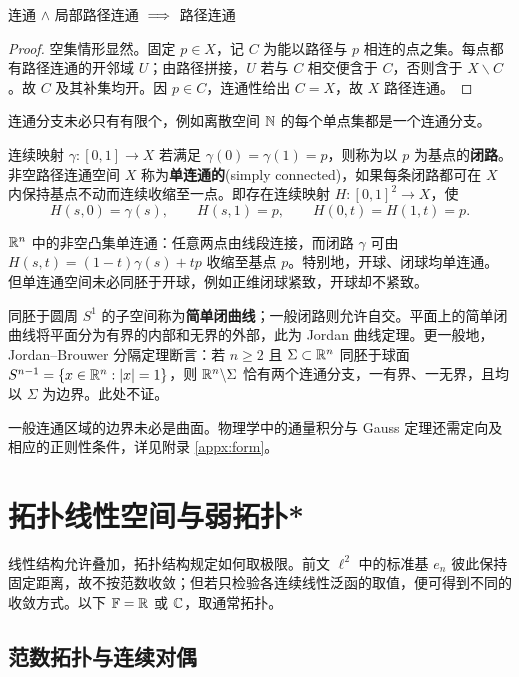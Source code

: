 \begin{theorem}
    连通 $\land$ 局部路径连通 $\implies$ 路径连通
\end{theorem}
\begin{proof}
    空集情形显然。固定 $p\in X$，记 $C$ 为能以路径与 $p$ 相连的点之集。每点都有路径连通的开邻域 $U$；由路径拼接，$U$ 若与 $C$ 相交便含于 $C$，否则含于 $X\backslash C$。故 $C$ 及其补集均开。因 $p\in C$，连通性给出 $C=X$，故 $X$ 路径连通。
\end{proof}

连通分支未必只有有限个，例如离散空间 $\mathbb{N}$ 的每个单点集都是一个连通分支。

\begin{definition}
    连续映射 $\gamma:[0,1]\to X$ 若满足 $\gamma(0)=\gamma(1)=p$，则称为以 $p$ 为基点的\textbf{闭路}。非空路径连通空间 $X$ 称为\textbf{单连通的}(simply connected)，如果每条闭路都可在 $X$ 内保持基点不动而连续收缩至一点。即存在连续映射 $H:[0,1]^2\to X$，使
    \[
        H(s,0)=\gamma(s),\qquad H(s,1)=p,\qquad H(0,t)=H(1,t)=p.
    \]
\end{definition}

\begin{example}
    $\mathbb{R}^n$ 中的非空凸集单连通：任意两点由线段连接，而闭路 $\gamma$ 可由 $H(s,t)=(1-t)\gamma(s)+tp$ 收缩至基点 $p$。特别地，开球、闭球均单连通。但单连通空间未必同胚于开球，例如正维闭球紧致，开球却不紧致。
\end{example}

同胚于圆周 $S^1$ 的子空间称为\textbf{简单闭曲线}；一般闭路则允许自交。平面上的简单闭曲线将平面分为有界的内部和无界的外部，此为 Jordan 曲线定理。更一般地，Jordan--Brouwer 分隔定理断言：若 $n\geq2$ 且 $\Sigma\subset\mathbb{R}^n$ 同胚于球面 $S^{n-1}=\{x\in\mathbb{R}^n:|x|=1\}$，则 $\mathbb{R}^n\backslash\Sigma$ 恰有两个连通分支，一有界、一无界，且均以 $\Sigma$ 为边界。此处不证。

一般连通区域的边界未必是曲面。物理学中的通量积分与 Gauss 定理还需定向及相应的正则性条件，详见附录 \ref{appx:form}。

\section{拓扑线性空间与弱拓扑*}\label{sec:weak-topology}

线性结构允许叠加，拓扑结构规定如何取极限。前文 $\ell^2$ 中的标准基 $e_n$ 彼此保持固定距离，故不按范数收敛；但若只检验各连续线性泛函的取值，便可得到不同的收敛方式。以下 $\mathbb{F}=\mathbb{R}$ 或 $\mathbb{C}$，取通常拓扑。

\subsection{范数拓扑与连续对偶}

